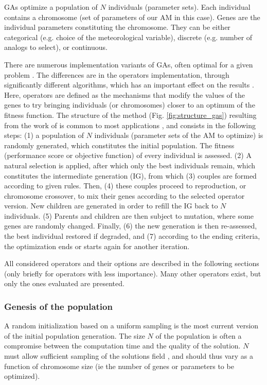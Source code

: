 \documentclass{ametsoc}
\begin{document}
GAs optimize a population of $N$ individuals (parameter sets). Each individual contains a chromosome (set of parameters of our AM in this case). Genes are the individual parameters constituting the chromosome. They can be either categorical (e.g. choice of the meteorological variable), discrete (e.g. number of analogs to select), or continuous.

There are numerous implementation variants of GAs, often optimal for a given problem \citep{Hart1991a, Schraudolph1992a}. The differences are in the operators implementation, through significantly different algorithms, which has an important effect on the results \citep{Gaffney2010a}. Here, operators are defined as the mechanisms that modify the values of the genes to try bringing individuals (or chromosomes) closer to an optimum of the fitness function. The structure of the method (Fig. \ref{fig:structure_gas}) resulting from the work of \citet{Holland1992b} is common to most applications \citep{Back1993b}, and consists in the following steps: (1) a population of $N$ individuals (parameter sets of the AM to optimize) is randomly generated, which constitutes the initial population. The fitness (performance score or objective function) of every individual is assessed. (2) A natural selection is applied, after which only the best individuals remain, which constitutes the intermediate generation (IG), from which (3) couples are formed according to given rules. Then, (4) these couples proceed to reproduction, or chromosome crossover, to mix their genes according to the selected operator version. New children are generated in order to refill the IG back to $N$ individuals. (5) Parents and children are then subject to mutation, where some genes are randomly changed. Finally, (6) the new generation is then re-assessed, the best individual restored if degraded, and (7) according to the ending criteria, the optimization ends or starts again for another iteration.


All considered operators and their options are described in the following sections (only briefly for operators with less importance). Many other operators exist, but only the ones evaluated are presented.

\subsubsection{Genesis of the population}

A random initialization based on a uniform sampling is the most current version of the initial population generation. The size $N$ of the population is often a compromise between the computation time and the quality of the solution. $N$ must allow sufficient sampling of the solutions field \citep{Beasley1996a}, and should thus vary as a function of chromosome size (ie the number of genes or parameters to be optimized). 
\end{document}
